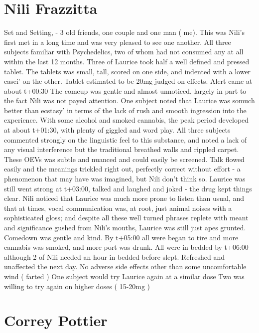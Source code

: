 \documentclass[12pt]{book}
\begin{document}
\chapter{Nili Frazzitta}

Set and Setting, - 3 old friends, one couple and one man ( me). This was Nili's first met in a long time and was very pleased to see one another. All three subjects familiar with Psychedelics, two of whom had not consumed any at all within the last 12 months. Three of Laurice took half a well defined and pressed tablet. The tablets was small, tall, scored on one side, and indented with a lower casei' on the other. Tablet estimated to be 20mg judged on effects. Alert came at about t+00:30 The comeup was gentle and almost unnoticed, largely in part to the fact Nili was not payed attention. One subject noted that Laurice was somuch better than ecstasy' in terms of the lack of rush and smooth ingression into the experience. With some alcohol and smoked cannabis, the peak period developed at about t+01:30, with plenty of giggled and word play. All three subjects commented strongly on the linguistic feel to this substance, and noted a lack of any visual interference but the traditional breathed walls and rippled carpet. These OEVs was subtle and nuanced and could easily be screened. Talk flowed easily and the meanings trickled right out, perfectly correct without effort - a phenomenon that may have was imagined, but Nili don't think so. Laurice was still went strong at t+03:00, talked and laughed and joked - the drug kept things clear. Nili noticed that Laurice was much more prone to listen than usual, and that at times, vocal communication was, at root, just animal noises with a sophisticated gloss; and despite all these well turned phrases replete with meant and significance gushed from Nili's mouths, Laurice was still just apes grunted. Comedown was gentle and kind. By t+05:00 all were began to tire and more cannabis was smoked, and more port was drunk. All were in bedded by t+06:00 although 2 of Nili needed an hour in bedded before slept. Refreshed and unaffected the next day. No adverse side effects other than some uncomfortable wind ( farted ) One subject would try Laurice again at a similar dose Two was willing to try again on higher doses ( 15-20mg )






\chapter{Correy Pottier}
\end{document}
